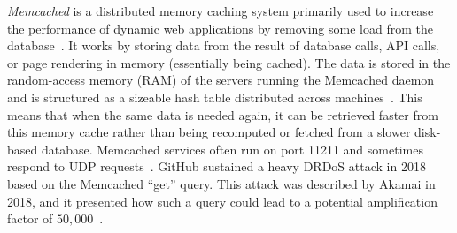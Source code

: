 
 \textit{Memcached} is a distributed memory caching system primarily used to increase the performance of dynamic web applications by removing some load from the database~\cite{memcached_github}. It works by storing data from the result of database calls, API calls, or page rendering in memory (essentially being cached). The data is stored in the random-access memory (RAM) of the servers running the Memcached daemon and is structured as a sizeable hash table distributed across machines~\cite{wiki_memcached}. This means that when the same data is needed again, it can be retrieved faster from this memory cache rather than being recomputed or fetched from a slower disk-based database.  Memcached services often run on port 11211 and sometimes respond to UDP requests~\cite{wiki_memcached}. GitHub sustained a heavy DRDoS attack in 2018 based on the Memcached ``get'' query. This attack was described by Akamai in 2018, and it presented how such a query could lead to a potential amplification factor of $50,000$~\cite{akamai2018attackspotlight}. 







 

